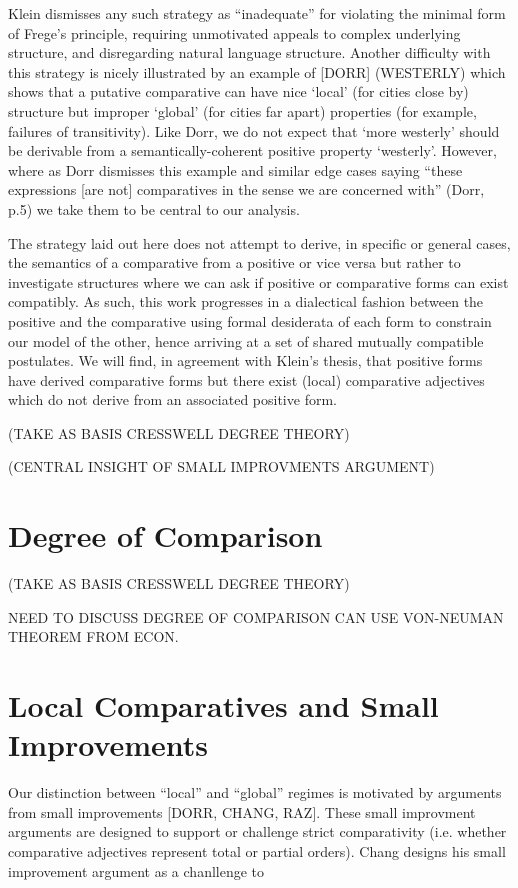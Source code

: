 \documentclass[12pt]{article}
\begin{document}
Klein dismisses any such strategy as ``inadequate'' for violating the minimal form of Frege's principle, requiring unmotivated appeals to complex underlying structure, and disregarding natural language structure.
Another difficulty with this strategy is nicely illustrated by an example of [DORR] (WESTERLY) which shows that a putative comparative can have nice `local' (for cities close by) structure but improper `global' (for cities far apart) properties (for example, failures of transitivity). Like Dorr, we do not expect that `more westerly' should be derivable from a semantically-coherent positive property `westerly'. However, where as Dorr dismisses this example and similar edge cases saying ``these expressions [are not] comparatives in the sense we are concerned with'' (Dorr, p.5) we take them to be central to our analysis.
\par 
The strategy laid out here does not attempt to derive, in specific or general cases, the semantics of a comparative from a positive or vice versa but rather to investigate structures where we can ask if positive or comparative forms can exist compatibly. As such, this work progresses in a dialectical fashion between the positive and the comparative using formal desiderata of each form to constrain our model of the other, hence arriving at a set of shared mutually compatible postulates. We will find, in agreement with Klein's thesis, that positive forms have derived comparative forms but there exist (local) comparative adjectives which do not derive from an associated positive form. 

(TAKE AS BASIS CRESSWELL DEGREE THEORY) 

(CENTRAL INSIGHT OF SMALL IMPROVMENTS ARGUMENT)

\section{Degree of Comparison}


(TAKE AS BASIS CRESSWELL DEGREE THEORY) 

NEED TO DISCUSS DEGREE OF COMPARISON CAN USE VON-NEUMAN THEOREM FROM ECON. 

\section{Local Comparatives and Small Improvements}

Our distinction between ``local'' and ``global'' regimes is motivated by arguments from small improvements [DORR, CHANG, RAZ]. These small improvment arguments are designed to support or challenge strict comparativity (i.e. whether comparative adjectives represent total or partial orders). Chang designs his small improvement argument as a chanllenge to  
\end{document}
